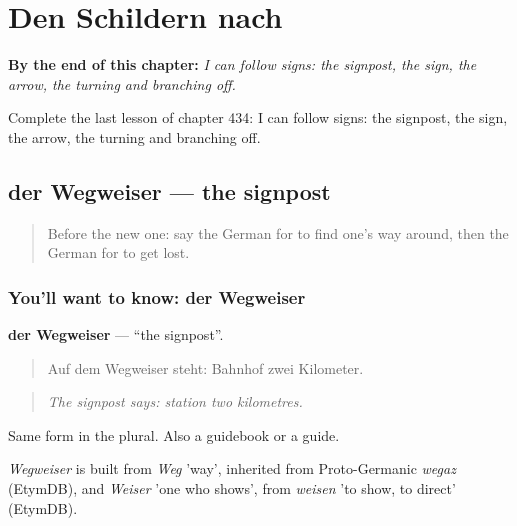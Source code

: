
\chapter{Den Schildern nach}
\label{ch:ge-den-schildern-nach}

\begin{chapteropening}
\textbf{By the end of this chapter:} \emph{I can follow signs: the signpost, the sign, the arrow, the turning and branching off.}

Complete the last lesson of chapter 434: I can follow signs: the signpost, the sign, the arrow, the turning and branching off.
\end{chapteropening}

\section[der Wegweiser]{der Wegweiser — the signpost}

\label{lesson:GE-C434-wegweiser}



\begin{quote}
Before the new one: say the German for to find one's way around, then the German for to get lost.
\end{quote}

\subsection*{You'll want to know: der Wegweiser}
\textbf{der Wegweiser} — \textquotedblleft{}the signpost\textquotedblright{}.

\begin{quote}
Auf dem Wegweiser steht: Bahnhof zwei Kilometer.
\end{quote}

\begin{quote}
\emph{The signpost says: station two kilometres.}
\end{quote}

Same form in the plural. Also a guidebook or a guide.

\begin{cousinweb}
\emph{Wegweiser} is built from \emph{Weg} 'way', inherited from Proto-Germanic \emph{wegaz} (EtymDB), and \emph{Weiser} 'one who shows', from \emph{weisen} 'to show, to direct' (EtymDB).
\end{cousinweb}

